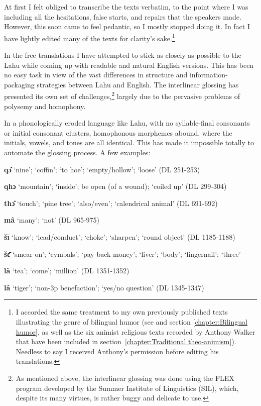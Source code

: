 At first I felt obliged to transcribe the texts verbatim, to the point
where I was including all the hesitations, false starts, and repairs
that the speakers made. However, this soon came to feel pedantic, so I
mostly stopped doing it. In fact I have lightly edited many of the
texts for clarity's sake.\footnote{I accorded the same treatment to my
  own previously published texts illustrating the genre of bilingual
  humor (see \citet{matisoff1969lahu} and section
  \ref{chapter:Bilingual humor}, as well as the six animist religious
    texts recorded by Anthony Walker that have been included in
    section~\ref{chapter:Traditional theo-animism}). Needless to
    say I received Anthony's permission before editing his
    translations.}

In the free translations I have attempted to stick as closely as
possible to the Lahu while coming up with readable and natural English
versions. This has been no easy task in view of the vast differences in
structure and information-packaging strategies between Lahu and English.
The interlinear glossing has presented its own set of
challenges,\footnote{As mentioned above, the interlinear glossing was
  done using the FLEX program developed by the Summer Institute of
  Linguistics (SIL), which, despite its many virtues, is rather buggy
  and delicate to use.} largely due to the pervasive problems of
polysemy and homophony.

In a phonologically eroded language like Lahu, with no syllable-final
consonants or initial consonant clusters, homophonous morphemes abound,
where the initials, vowels, and tones are all identical. This has made
it impossible totally to automate the glossing process. A few examples:

\textbf{qɔ̂} `nine'; `coffin'; `to hoe'; `empty/hollow'; `loose' (DL
251-253)

\textbf{qhɔ} `mountain'; `inside'; be open (of a wound); `coiled up'
(DL 299-304)

\textbf{thɔ̂} `touch'; `pine tree'; `also/even'; `calendrical animal' (DL
691-692)

\textbf{mâ} `many'; `not' (DL 965-975)

\textbf{šī} `know'; `lead/conduct'; `choke'; `sharpen'; `round object'
(DL 1185-1188)

\textbf{šɛ̄} `smear on'; `cymbals'; `pay back money'; `liver'; `body';
`fingernail'; `three'

\textbf{là} `tea'; `come'; `million' (DL 1351-1352)

\textbf{lâ} `tiger'; `non-3p benefaction'; `yes/no question' (DL
1345-1347)

